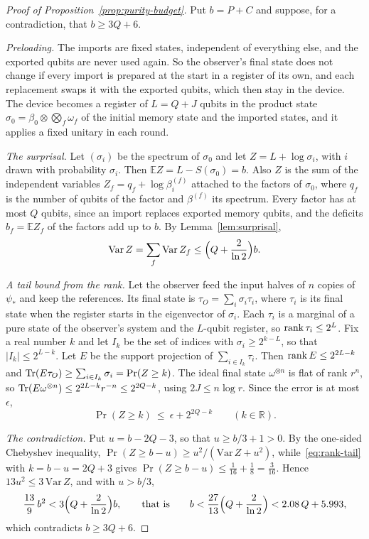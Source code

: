 \begin{proof}[Proof of Proposition~\ref{prop:purity-budget}]
Put $b=P+C$ and suppose, for a contradiction, that $b\ge3Q+6$.

\emph{Preloading.} The imports are fixed states, independent of everything else, and the exported qubits are never used again. So the observer's
final state does not change if every import is prepared at the start in a register of its own, and each replacement swaps it with the exported
qubits, which then stay in the device. The device becomes a register of $L=Q+J$ qubits in the product state
$\sigma_0=\beta_0\otimes\bigotimes_f\omega_f$ of the initial memory state and the imported states, and it applies a fixed unitary in each round.

\emph{The surprisal.} Let $(\sigma_i)$ be the spectrum of $\sigma_0$ and let $Z=L+\log\sigma_i$, with $i$ drawn with probability $\sigma_i$. Then
$\mathbb EZ=L-S(\sigma_0)=b$. Also $Z$ is the sum of the independent variables $Z_f=q_f+\log\beta^{(f)}_i$ attached to the factors of $\sigma_0$,
where $q_f$ is the number of qubits of the factor and $\beta^{(f)}$ its spectrum. Every factor has at most $Q$ qubits, since an import replaces
exported memory qubits, and the deficits $b_f=\mathbb EZ_f$ of the factors add up to $b$. By Lemma~\ref{lem:surprisal},
\[
\mathrm{Var}\,Z=\sum_f\mathrm{Var}\,Z_f\le\Bigl(Q+\frac2{\ln2}\Bigr)b .
\]

\emph{A tail bound from the rank.} Let the observer feed the input halves of $n$ copies of $\psi_*$ and keep the references. Its final state is
$\tau_O=\sum_i\sigma_i\tau_i$, where $\tau_i$ is its final state when the register starts in the eigenvector of $\sigma_i$. Each $\tau_i$ is a
marginal of a pure state of the observer's system and the $L$-qubit register, so $\operatorname{rank}\tau_i\le2^L$. Fix a real number $k$ and let $I_k$ be the
set of indices with $\sigma_i\ge2^{k-L}$, so that $|I_k|\le2^{L-k}$. Let $E$ be the support projection of $\sum_{i\in I_k}\tau_i$. Then
$\operatorname{rank} E\le2^{2L-k}$ and $\operatorname{Tr}(E\tau_O)\ge\sum_{i\in I_k}\sigma_i=\Pr(Z\ge k)$. The ideal final state $\omega^{\otimes n}$ is flat of rank $r^n$, so
$\operatorname{Tr}(E\omega^{\otimes n})\le2^{2L-k}r^{-n}\le2^{2Q-k}$, using $2J\le n\log r$. Since the error is at most $\epsilon$,
\begin{equation}\label{eq:rank-tail}
\Pr(Z\ge k)\ \le\ \epsilon+2^{2Q-k}\qquad(k\in\mathbb R).
\end{equation}

\emph{The contradiction.} Put $u=b-2Q-3$, so that $u\ge b/3+1>0$. By the one-sided Chebyshev inequality,
$\Pr(Z\ge b-u)\ge u^2/(\mathrm{Var}\,Z+u^2)$, while~\eqref{eq:rank-tail} with $k=b-u=2Q+3$ gives $\Pr(Z\ge b-u)\le\frac1{16}+\frac18=\frac3{16}$. Hence
$13u^2\le3\,\mathrm{Var}\,Z$, and with $u>b/3$,
\[
\frac{13}9\,b^2<3\Bigl(Q+\frac2{\ln2}\Bigr)b,\qquad\text{that is}\qquad b<\frac{27}{13}\Bigl(Q+\frac2{\ln2}\Bigr)<2.08\,Q+5.993 ,
\]
which contradicts $b\ge3Q+6$.
\end{proof}
